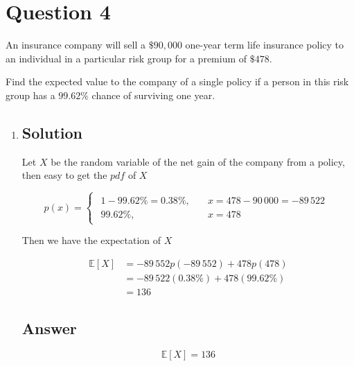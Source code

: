 \documentclass[12pt]{article}
\newcommand{\bE}{\mathbb{E}}
\begin{document}
	
	\section*{Question 4}
	
	\noindent An insurance company will sell a $\$90,000$ one-year term life insurance policy to an individual in a particular risk group for a premium of $\$478$.
	
	\bigskip
	
	\noindent Find the expected value to the company of a single policy if a person in this risk group has a $99.62\%$ chance of surviving one year.
	
	\bigskip
	
	\begin{enumerate}[label={},leftmargin=0in]\item
		\subsection*{Solution}
		
			Let $X$ be the random variable of the net gain of the company from a policy, then easy to get the $pdf$ of $X$
			
			\[
				p(x) =
				\begin{cases}
					\begin{aligned}
						1 - 99.62\% = 0.38\%,&\quad x = 478 - 90\,000 = -89\,522\\
						99.62\%,&\quad x = 478
					\end{aligned}
				\end{cases}
			\]
			
			Then we have the expectation of $X$
			
			\[
				\begin{aligned}
					\bE[X] &= -89\,552p(-89\,552) + 478p(478)\\
					&= -89\,522(0.38\%) + 478(99.62\%)\\
					&= 136
				\end{aligned}
			\]
					
		\subsection*{Answer}
		
			\[\boxed{\bE[X] = 136}\]
	\end{enumerate}
	
\end{document}
